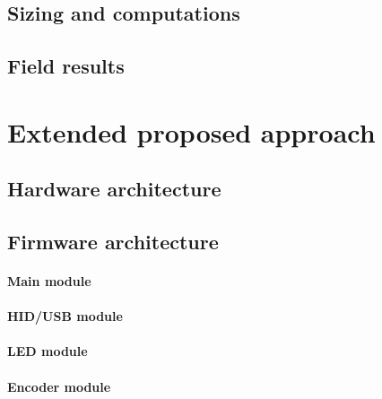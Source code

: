 \documentclass[a4paper,10pt]{article}
\begin{document}
\begin{multicols}{2}
\subsection{Sizing and computations}

\TODO


\subsection{Field results}

\TODO


\section{Extended proposed approach}

\TODO


\subsection{Hardware architecture}

\TODO


\subsection{Firmware architecture}

\TODO


\paragraph{Main module}
\TODO


\paragraph{HID/USB module}
\TODO


\paragraph{LED module}
\TODO


\paragraph{Encoder module}
\TODO



\end{multicols}
\end{document}
